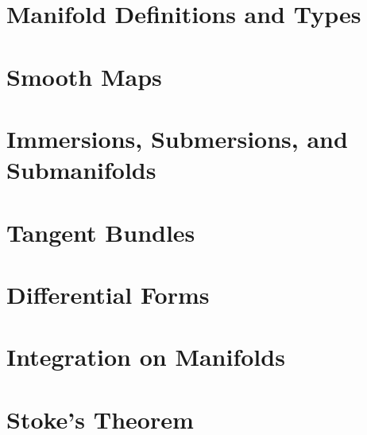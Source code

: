 \documentclass[12pt, a4paper, oneside, openright, titlepage]{book}
\begin{document}
\chapter{Manifold Definitions and Types}


\chapter{Smooth Maps}



\chapter{Immersions, Submersions, and Submanifolds}



\chapter{Tangent Bundles}


\chapter{Differential Forms}



\chapter{Integration on Manifolds}



\chapter{Stoke's Theorem}
\end{document}
